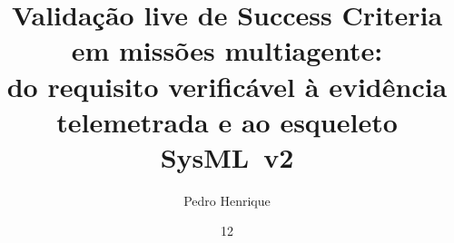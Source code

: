 \documentclass[msc]{ita}
\author{Pedro Henrique}{Blatt Machado}
\title{Validação live de Success Criteria em missões multiagente:\\
do requisito verificável à evidência telemetrada e ao esqueleto SysML~v2}
\date{12}{agosto}{2026} %
\begin{document}


\mainmatter






\renewcommand\bibname{\itareferencesnamebabel}
\printbibliography

\appendix


\annex


\end{document}
